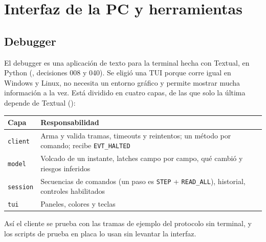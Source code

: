 \section{Interfaz de la PC y herramientas}
\label{sec:interfaz}

\subsection{Debugger}

El debugger es una aplicación de texto para la terminal hecha con Textual, en Python
(, decisiones 008 y 040). Se eligió una TUI porque corre igual en Windows y
Linux, no necesita un entorno gráfico y permite mostrar mucha información a la vez. Está dividido
en cuatro capas, de las que solo la última depende de Textual ():

\begin{center}
\small
\begin{tabular}{@{}l l@{}}
  \toprule
  \textbf{Capa} & \textbf{Responsabilidad} \\
  \midrule
  \texttt{client}  & Arma y valida tramas, timeouts y reintentos; un método por comando; recibe \texttt{EVT\_HALTED} \\
  \texttt{model}   & Volcado de un instante, latches campo por campo, qué cambió y riesgos inferidos \\
  \texttt{session} & Secuencias de comandos (un paso es \texttt{STEP} + \texttt{READ\_ALL}), historial, controles habilitados \\
  \texttt{tui}     & Paneles, colores y teclas \\
  \bottomrule
\end{tabular}
\end{center}

Así el cliente se prueba con las tramas de ejemplo del protocolo sin terminal, y los scripts de
prueba en placa lo usan sin levantar la interfaz.


